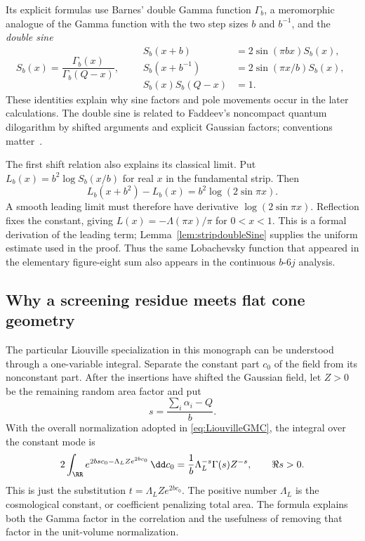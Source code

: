 Its explicit formulas use Barnes' double Gamma function $\Gamma_b$,
a meromorphic analogue of the Gamma function with the two step
sizes $b$ and $b^{-1}$, and the \emph{double sine}
\begin{equation}
 S_b(x)=\frac{\Gamma_b(x)}{\Gamma_b(Q-x)},\qquad
 \begin{aligned}
 S_b(x+b)&=2\sin(\pi bx)S_b(x),\\
 S_b(x+b^{-1})&=2\sin(\pi x/b)S_b(x),\\
 S_b(x)S_b(Q-x)&=1.
 \end{aligned}
 \label{eq:introdoublesine}
\end{equation}
These identities explain why sine factors and pole movements occur
in the later calculations. The double sine is related to Faddeev's
noncompact quantum dilogarithm by shifted arguments and explicit
Gaussian factors; conventions matter~\cite[Appendix A]{TeschnerVartanov}.

The first shift relation also explains its classical limit. Put
$L_b(x)=b^2\log S_b(x/b)$ for real $x$ in the fundamental strip.
Then
\[
 L_b(x+b^2)-L_b(x)=b^2\log(2\sin\pi x).
\]
A smooth leading limit must therefore have derivative
$\log(2\sin\pi x)$. Reflection fixes the constant, giving
$L(x)=-\Lambda(\pi x)/\pi$ for $0<x<1$. This is a formal
derivation of the leading term; Lemma~\ref{lem:stripdoubleSine}
supplies the uniform estimate used in the proof. Thus the same
Lobachevsky function that appeared in the elementary figure-eight
sum also appears in the continuous $b$-$6j$ analysis.

\subsection{Why a screening residue meets flat cone geometry}
\label{sec:introscreening}

The particular Liouville specialization in this monograph can be
understood through a one-variable integral. Separate the constant
part $c_0$ of the field from its nonconstant part. After the
insertions have shifted the Gaussian field, let $Z>0$ be the
remaining random area factor and put
\[
 s=\frac{\sum_i\alpha_i-Q}{b}.
\]
With the overall normalization adopted in
\eqref{eq:LiouvilleGMC}, the integral over the constant mode is
\begin{equation}
 2\int_{\RR}e^{2bs c_0-\Lambda_L Z e^{2bc_0}}\,\dd c_0
 =\frac1b\Lambda_L^{-s}\Gamma(s)Z^{-s},\qquad \Re s>0.
 \label{eq:introzeromode}
\end{equation}
This is just the substitution $t=\Lambda_L Z e^{2bc_0}$. The
positive number $\Lambda_L$ is the cosmological constant, or
coefficient penalizing total area. The formula explains both the
Gamma factor in the correlation and the usefulness of removing
that factor in the unit-volume normalization.

